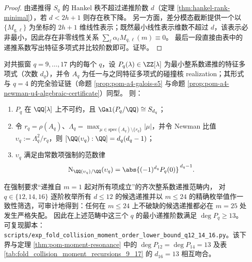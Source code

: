 \begin{proof}
由递推得 \(S_q\) 的 Hankel 秩不超过递推阶数 \(d\)（定理 \ref{thm:hankel-rank-minimal}），若 \(d<2h+1\) 则存在秩下降。
另一方面，差分模态截断提供一个以 \(\{M_{q,\ell}\}\) 为坐标的 \(2h+1\) 维线性表示；既然最小线性表示维数不超过 \(d\)，该表示必非最小，因此存在非零线性关系 \(\sum_{\ell}\alpha_\ell M_{q,\ell}(m)\equiv 0\)。
最后一段直接由表中的递推系数写出特征多项式并比较阶数即可。证毕。
\end{proof}



\begin{conjecture}\label{conj:pom-resonance-full-symmetric-galois-norm-law}
对共振窗 \(q=9,\dots,17\) 内的每个 \(q\)，设 \(P_q(\lambda)\in\ZZ[\lambda]\) 为最小整系数递推的特征多项式（次数 \(d_q\)），并令 \(A_q\) 为任一与之同特征多项式的碰撞核 realization；其形式与 \(q=4\) 的完全验证链（命题 \ref{prop:pom-a4-galois-s5} 与命题 \ref{prop:pom-a4-newman-u4-algebraic-certificate}）同型。
则：
\begin{enumerate}
  \item \(P_q\) 在 \(\QQ[\lambda]\) 上不可约，且 \(\Gal(P_q/\QQ)\cong S_{d_q}\)；
  \item 令 \(r_q=\rho(A_q)\)、\(\Lambda_q=\max_{\mu\in\mathrm{spec}(A_q)\setminus\{r_q\}}|\mu|\)，并令 Newman 比值 \(\upsilon_q:=\Lambda_q^2/r_q\)，则 \([\QQ(\upsilon_q):\QQ]=d_q(d_q-1)\)；
  \item \(\upsilon_q\) 满足由常数项强制的范数律
  \[
  \mathrm{N}_{\QQ(\upsilon_q)/\QQ}(\upsilon_q)=\abs{(-1)^{d_q}P_q(0)}^{\,d_q-1}.
  \]
\end{enumerate}
\end{conjecture}

\begin{remark}[高阶复杂度的延迟显影：\texorpdfstring{$q=12,14,16$}{q=12,14,16} 的阶数下界可由 \texorpdfstring{$m=25$}{m=25} 的首破缺审计锁定]\label{rem:pom-moment-order-lb-q12-14-16-m25}
在强制要求“递推自 \(m=1\) 起对所有项成立”的齐次整系数递推范畴内，
对 \(q\in\{12,14,16\}\) 逐阶枚举所有 \(d\le 12\) 的候选递推并以 \(m\le 24\) 的精确枚举值作一致性筛选，可审计地得到：任何在 \(m\le 24\) 上不破缺的候选递推都必在 \(m=25\) 处发生严格失配。
因此在上述范畴中这三个 \(q\) 的最小递推阶数满足
\(
\deg P_q\ge 13
\)。
可复现脚本：\texttt{scripts/exp\_fold\_collision\_moment\_order\_lower\_bound\_q12\_14\_16.py}。该下界与定理 \ref{thm:pom-moment-resonance} 中的 \(\deg P_{12}=\deg P_{14}=13\) 及表 \ref{tab:fold_collision_moment_recursions_9_17} 的 \(d_{16}=13\) 相互吻合。
\end{remark}

